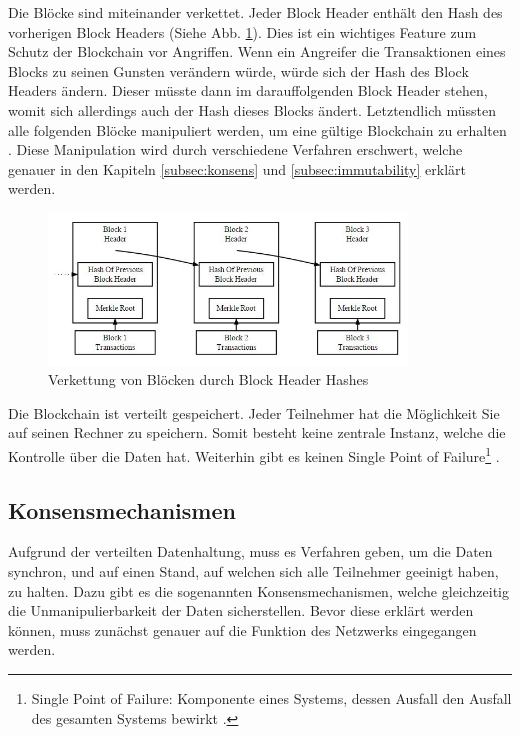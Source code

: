 Die Blöcke sind miteinander verkettet. Jeder Block Header enthält den Hash  des vorherigen Block Headers (Siehe Abb. \ref{fig:block-chain}). Dies ist ein wichtiges Feature zum Schutz der Blockchain vor Angriffen. Wenn ein Angreifer die Transaktionen eines Blocks zu seinen Gunsten verändern würde, würde sich der Hash des Block Headers ändern. Dieser müsste dann im darauffolgenden Block Header stehen, womit sich allerdings auch der Hash dieses Blocks ändert. Letztendlich müssten alle folgenden Blöcke manipuliert werden, um eine gültige Blockchain zu erhalten \cite{NakamotoBitcoinPeertoPeerElectronic2008}. Diese Manipulation wird durch verschiedene Verfahren erschwert, welche genauer in den Kapiteln \ref{subsec:konsens} und \ref{subsec:immutability} erklärt werden.

\begin{figure}[htb]
  \centering
	\includegraphics[width=0.85\textwidth,angle=0]{images/block-chain}
 	\caption{Verkettung von Blöcken durch Block Header Hashes}
	\label{fig:block-chain}
\end{figure}

Die Blockchain ist verteilt gespeichert. Jeder Teilnehmer hat die Möglichkeit Sie auf seinen Rechner zu speichern. Somit besteht keine zentrale Instanz, welche die Kontrolle über die Daten hat. Weiterhin gibt es keinen Single Point of Failure\footnote{Single Point of Failure: Komponente eines Systems, dessen Ausfall den Ausfall des gesamten Systems bewirkt \cite{WikipediaSinglePointFailure2016}.} \cite{CrosbyBlockChainTechnologyBitcoin2016}.

\label{subsec:konsens}
\subsection{Konsensmechanismen}
Aufgrund der verteilten Datenhaltung, muss es Verfahren geben, um die Daten synchron, und auf einen Stand, auf welchen sich alle Teilnehmer geeinigt haben, zu halten. Dazu gibt es die sogenannten Konsensmechanismen, welche gleichzeitig die Unmanipulierbarkeit der Daten sicherstellen. Bevor diese erklärt werden können, muss zunächst genauer auf die Funktion des Netzwerks eingegangen werden.

